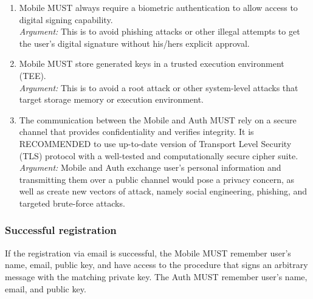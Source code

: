 \begin{enumerate}
                  \item Mobile MUST always require a biometric authentication to allow access to digital signing 
                        capability.\\        
                  \textit{Argument:} This is to avoid phishing attacks or other illegal attempts to get the user's 
                  digital signature without his/hers explicit approval.

                  \item Mobile MUST store generated keys in a trusted execution environment (TEE).\\        
                  \textit{Argument:} This is to avoid a root attack or other system-level attacks that target storage 
                  memory or execution environment.

                  \item The communication between the Mobile and Auth MUST rely on a secure channel that provides 
                        confidentiality and verifies integrity. It is RECOMMENDED to use up-to-date version of 
                        Transport Level Security (TLS) protocol with a well-tested and computationally secure 
                        cipher suite.\\      
                  \textit{Argument:} Mobile and Auth exchange user's personal information and transmitting them over a 
                  public channel would pose a privacy concern, as well as create new vectors of attack, 
                  namely social engineering, phishing, and targeted brute-force attacks.
            \end{enumerate}

            \subsubsection{Successful registration}
            If the registration via email is successful, the Mobile MUST remember user's name, email, public key, and 
            have access to the procedure that signs an arbitrary message with the matching private key. The Auth MUST 
            remember user's name, email, and public key.

